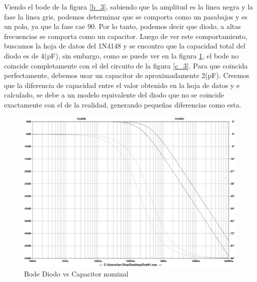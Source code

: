 Viendo el bode de la figura \ref{b_3}, sabiendo que la amplitud es
la linea negra y la fase la linea gris, podemos determinar que se
comporta como un pasabajos y es un polo, ya que la fase cae 90\textdegree .
Por lo tanto, podemos decir que diodo, a altas frecuencias se comporta
como un capacitor. Luego de ver este comportamiento, buscamos la hoja
de datos del 1N4148 y se encontro que la capacidad total del diodo
es de 4(pF), sin embargo, como se puede ver en la figura \ref{b2_3},
el bode no coincide completamente con el del circuito de la figura
\ref{c_3}. Para que coincida perfectamente, debemos usar un capacitor
de aproximadamente 2(pF). Creemos que la diferencia de capacidad entre
el valor obtenido en la hoja de datos y e calculado, se debe a un
modelo equivalente del diodo que no se coincide exactamente con el
de la realidad, generando pequeñas diferencias como esta.

\begin{figure}[H]
\begin{centering}
\includegraphics[scale=0.2]{../EJ3/Bode2}
\par\end{centering}
\caption{Bode Diodo vs Capacitor nominal}
\label{b2_3}
\end{figure}










